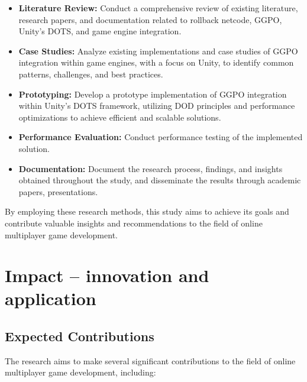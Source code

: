 \begin{itemize}
    \item \textbf{Literature Review:} Conduct a comprehensive review of existing literature, research papers, and documentation related to rollback netcode, GGPO,  Unity's DOTS, and game engine integration.
    
    \item \textbf{Case Studies:} Analyze existing implementations and case studies of GGPO integration within game engines, with a focus on Unity, to identify common patterns, challenges, and best practices.
    
    \item \textbf{Prototyping:} Develop a prototype implementation of GGPO  integration within Unity's DOTS framework, utilizing DOD principles and performance optimizations to achieve efficient and scalable solutions.
    
    \item \textbf{Performance Evaluation:} Conduct performance testing of the implemented solution.
    
    \item \textbf{Documentation:} Document the research process, findings, and insights obtained throughout the study, and disseminate the results through academic papers, presentations.
\end{itemize}

By employing these research methods, this study aims to achieve its goals and contribute valuable insights and recommendations to the field of online multiplayer game development.

\section{Impact -- innovation and application}

\subsection{Expected Contributions}

The research aims to make several significant contributions to the field of online multiplayer game development, including:

